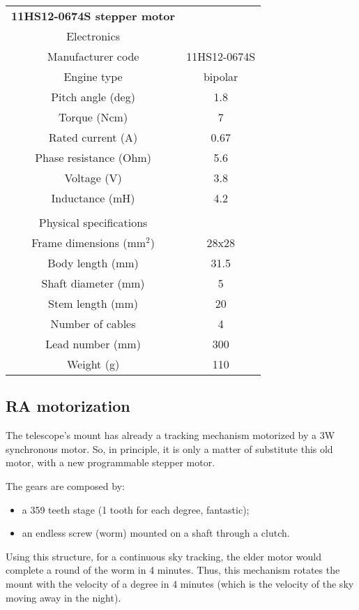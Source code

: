 \begin{minipage}{0.5\textwidth}
    \centering
    \begin{tabular}{cc}
        \textbf{11HS12-0674S stepper motor}&\\
        Electronics&\\
        \hline
        Manufacturer code & 11HS12-0674S\\
        Engine type & bipolar\\
        Pitch angle (deg) & 1.8 \\
        Torque (Ncm)& 7\\
        Rated current (A) & 0.67\\
        Phase resistance (Ohm)& 5.6\\
        Voltage (V)& 3.8\\
        Inductance (mH)& 4.2\\
         & \\
        Physical specifications&\\
        \hline
        Frame dimensions (mm\(^2\))& 28x28 \\
        Body length (mm)& 31.5 \\
        Shaft diameter (mm)& 5 \\
        Stem length (mm)& 20 \\
        Number of cables & 4\\
        Lead number (mm)& 300 \\
        Weight (g) & 110\\
        \hline
    \end{tabular}
    \label{tab:nema_11_specifics}
\end{minipage}

\subsection{RA motorization}
The telescope's mount has already a tracking mechanism motorized by a 3W synchronous motor.
So, in principle, it is only a matter of substitute this old motor, with a new programmable stepper motor.

The gears are composed by:
\begin{itemize}
    \item a 359 teeth stage (1 tooth for each degree, fantastic);
    \item an endless screw (worm) mounted on a shaft through a clutch.
\end{itemize}
Using this structure, for a continuous sky tracking, the elder motor would complete a round of the worm in 4 minutes.
Thus, this mechanism rotates the mount with the velocity of a degree in 4 minutes (which is the velocity of the sky moving away in the night).

